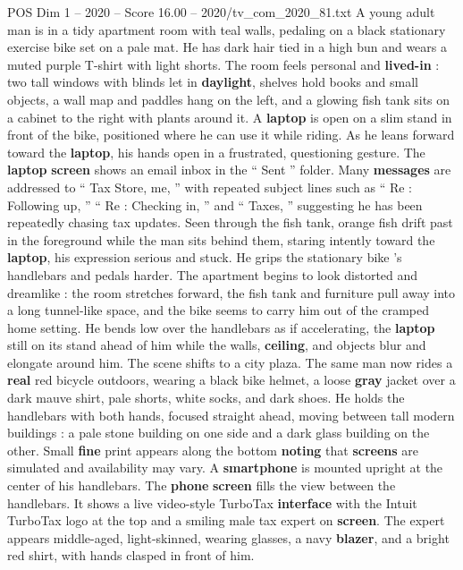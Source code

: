 \begin{textsample}{POS Dim 1 – 2020 – Score 16.00 – 2020/tv\_com\_2020\_81.txt}  \label{ex:f1_pos_008}
A young adult man is in a tidy apartment room with teal walls, pedaling on a black stationary exercise bike set on a pale mat.
He has dark hair tied in a high bun and wears a muted purple T-shirt with light shorts.
The room feels personal and \textbf{lived-in} : two tall windows with blinds let in \textbf{daylight}, shelves hold books and small objects, a wall map and paddles hang on the left, and a glowing fish tank sits on a cabinet to the right with plants around it.
A \textbf{laptop} is open on a slim stand in front of the bike, positioned where he can use it while riding.
As he leans forward toward the \textbf{laptop}, his hands open in a frustrated, questioning gesture.
The \textbf{laptop} \textbf{screen} shows an email inbox in the “ Sent ” folder.
Many \textbf{messages} are addressed to “ Tax Store, me, ” with repeated subject lines such as “ Re : Following up, ” “ Re : Checking in, ” and “ Taxes, ” suggesting he has been repeatedly chasing tax updates.
Seen through the fish tank, orange fish drift past in the foreground while the man sits behind them, staring intently toward the \textbf{laptop}, his expression serious and stuck.
He grips the stationary bike ’s handlebars and pedals harder.
The apartment begins to look distorted and dreamlike : the room stretches forward, the fish tank and furniture pull away into a long tunnel-like space, and the bike seems to carry him out of the cramped home setting.
He bends low over the handlebars as if accelerating, the \textbf{laptop} still on its stand ahead of him while the walls, \textbf{ceiling}, and objects blur and elongate around him.
The scene shifts to a city plaza.
The same man now rides a \textbf{real} red bicycle outdoors, wearing a black bike helmet, a loose \textbf{gray} jacket over a dark mauve shirt, pale shorts, white socks, and dark shoes.
He holds the handlebars with both hands, focused straight ahead, moving between tall modern buildings : a pale stone building on one side and a dark glass building on the other.
Small \textbf{fine} print appears along the bottom \textbf{noting} that \textbf{screens} are simulated and availability may vary.
A \textbf{smartphone} is mounted upright at the center of his handlebars.
The \textbf{phone} \textbf{screen} fills the view between the handlebars.
It shows a live video-style TurboTax \textbf{interface} with the Intuit TurboTax logo at the top and a smiling male tax expert on \textbf{screen}.
The expert appears middle-aged, light-skinned, wearing glasses, a navy \textbf{blazer}, and a bright red shirt, with hands clasped in front of him.

\end{textsample}
